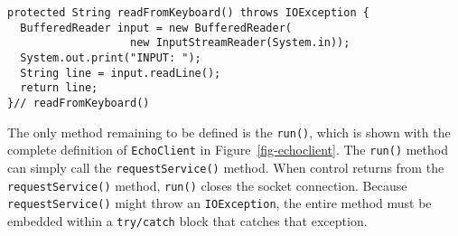 \begin{jjjlisting}
\begin{lstlisting}
protected String readFromKeyboard() throws IOException {
  BufferedReader input = new BufferedReader(
                   new InputStreamReader(System.in));
  System.out.print("INPUT: ");
  String line = input.readLine();
  return line;
}// readFromKeyboard()
\end{lstlisting}
\end{jjjlisting}

The only method remaining to be defined is the {\tt run()}, which is
shown with the complete definition of {\tt EchoClient} in
Figure~\ref{fig-echoclient}.  The {\tt run()} method can simply call
the {\tt requestService()} method.  When control returns from the
{\tt requestService()} method, {\tt run()} closes the socket connection.
Because {\tt requestService()} might throw an {\tt IOException}, the entire
method must be embedded within a {\tt try/catch} block that catches
that exception.

